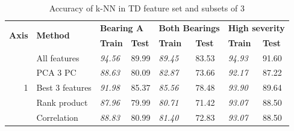 \documentclass{llncs}
\begin{document}
\begin{table}
\centering
\caption{Accuracy of k-NN in TD feature set and subsets of 3}
\label{tab:fsel-methods-td}
\begin{tabular}{|r|l|p{1.2cm}|p{1.2cm}|p{1.2cm}|p{1.2cm}|p{1.2cm}|p{1.2cm}|}
\hline
\multicolumn{1}{|l|}{\multirow{2}{*}{\textbf{Axis}}} & \multicolumn{1}{l|}{\multirow{2}{*}{\textbf{Method}}} & \multicolumn{2}{l|}{\textbf{Bearing A}}                                  & \multicolumn{2}{l|}{\textbf{Both Bearings}}                              & \multicolumn{2}{l|}{\textbf{High severity}}                              \\ \cline{3-8} 
\multicolumn{1}{|l|}{}                               & \multicolumn{1}{l|}{}                                 & \multicolumn{1}{l|}{\textbf{Train}} & \multicolumn{1}{l|}{\textbf{Test}} & \multicolumn{1}{l|}{\textbf{Train}} & \multicolumn{1}{l|}{\textbf{Test}} & \multicolumn{1}{l|}{\textbf{Train}} & \multicolumn{1}{l|}{\textbf{Test}} \\ \hline
\multirow{7}{*}{1}                                   & All features                                          & \textit{94.56}                      & 89.99                              & \textit{89.45}                      & 83.53                              & \textit{94.93}                      & 91.60                              \\
                                                     & PCA 3 PC                                              & \textit{88.63}                      & 80.09                              & \textit{82.87}                      & 73.66                              & \textit{92.17}                      & 87.22                              \\
                                                     & Best 3 features                                       & \textit{91.98}                      & 85.37                              & \textit{85.56}                      & 78.48                              & \textit{93.90}                      & 89.64                              \\
                                                     & Rank product                                          & \textit{87.96}                      & 79.99                              & \textit{80.71}                      & 71.42                              & \textit{93.07}                      & 88.50                              \\
                                                     & Correlation                                           & \textit{88.83}                      & 80.99                              & \textit{81.40}                      & 72.83                              & \textit{93.07}                      & 88.50                              \\

\end{tabular}
\end{table}
\end{document}
